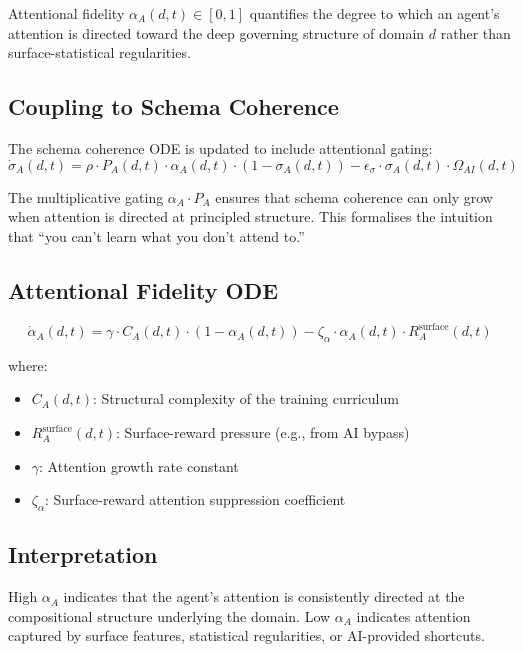 \documentclass[11pt,a4paper]{article}
\begin{document}
Attentional fidelity $\alpha_A(d,t) \in [0,1]$ quantifies the degree
to which an agent's attention is directed toward the deep governing
structure of domain $d$ rather than surface-statistical regularities.

\subsection{Coupling to Schema Coherence}

The schema coherence ODE is updated to include attentional gating:
\begin{equation}\label{app:eq:sigma-ode}
\dot{\sigma}_A(d,t) = \rho \cdot P_A(d,t) \cdot \alpha_A(d,t) \cdot (1 - \sigma_A(d,t)) - \epsilon_{\sigma} \cdot \sigma_A(d,t) \cdot \Omega_{AI}(d,t)
\end{equation}

The multiplicative gating $\alpha_A \cdot P_A$ ensures that schema
coherence can only grow when attention is directed at principled
structure. This formalises the intuition that ``you can't learn what
you don't attend to.''

\subsection{Attentional Fidelity ODE}

\begin{equation}\label{app:eq:alpha-ode}
\dot{\alpha}_A(d,t) = \gamma \cdot C_A(d,t) \cdot (1 - \alpha_A(d,t)) - \zeta_{\alpha} \cdot \alpha_A(d,t) \cdot R_A^{\text{surface}}(d,t)
\end{equation}

where:
\begin{itemize}[nosep]
\item $C_A(d,t)$: Structural complexity of the training curriculum
\item $R_A^{\text{surface}}(d,t)$: Surface-reward pressure (e.g., from AI bypass)
\item $\gamma$: Attention growth rate constant
\item $\zeta_{\alpha}$: Surface-reward attention suppression coefficient
\end{itemize}

\subsection{Interpretation}

High $\alpha_A$ indicates that the agent's attention is consistently
directed at the compositional structure underlying the domain. Low
$\alpha_A$ indicates attention captured by surface features, statistical
regularities, or AI-provided shortcuts.
\end{document}
